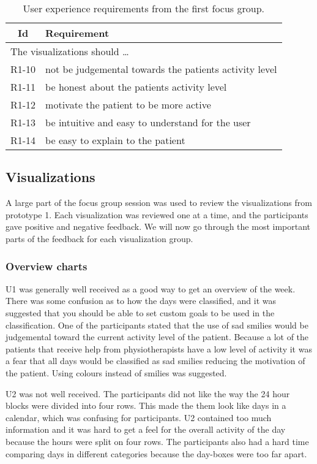 \begin{table}[h!]
  \begin{center}
  \begin{tabular}{|c|p{12cm}|}
    \hline
      \textbf{Id} & \textbf{Requirement} \\ \hline
    \multicolumn{2}{|l|}{The visualizations should \ldots} \\ \hline
      R1-10 & not be judgemental towards the patients activity level \\ \hline
      R1-11 & be honest about the patients activity level \\ \hline
      R1-12 & motivate the patient to be more active \\ \hline
      R1-13 & be intuitive and easy to understand for the user \\ \hline
      R1-14 & be easy to explain to the patient \\ \hline
  \end{tabular}
  \end{center}
  \caption{User experience requirements from the first focus group.}
\end{table}

\subsection{Visualizations}
A large part of the focus group session was used to review the visualizations from prototype 1. Each visualization was reviewed one at a time, and the participants gave positive and negative feedback. We will now go through the most important parts of the feedback for each visualization group.

\subsubsection{Overview charts}
U1 was generally well received as a good way to get an overview of the week. There was some confusion as to how the days were classified, and it was suggested that you should be able to set custom goals to be used in the classification. One of the participants stated that the use of sad smilies would be judgemental toward the current activity level of the patient. Because a lot of the patients that receive help from physiotherapists have a low level of activity it was a fear that all days would be classified as sad smilies reducing the motivation of the patient. Using colours instead of smilies was suggested.

U2 was not well received. The participants did not like the way the 24 hour blocks were divided into four rows. This made the them look like days in a calendar, which was confusing for participants. U2 contained too much information and it was hard to get a feel for the overall activity of the day because the hours were split on four rows. The participants also had a hard time comparing days in different categories because the day-boxes were too far apart.


